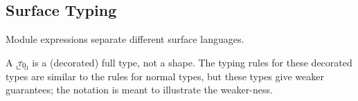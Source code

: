 \documentclass[nonacm,10pt]{acmart}
\begin{document}
\newpage
\subsection{Surface Typing}

Module expressions separate different surface languages.

A $\tfloor{\stype_0}$ is a (decorated) full type, not a shape.
The typing rules for these decorated types are similar to the rules
 for normal types, but these types give weaker guarantees; the notation
 is meant to illustrate the weaker-ness.

\begin{mathpar}














\end{mathpar}
\end{document}
